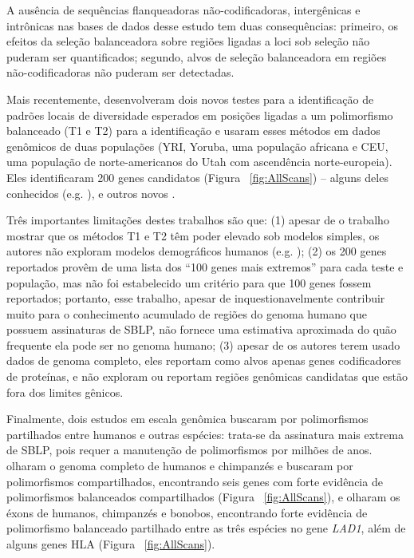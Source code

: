 \begin{refsection}
A ausência de sequências flanqueadoras não-codificadoras, intergênicas e intrônicas nas bases de dados desse estudo tem duas consequências: primeiro, os efeitos da seleção balanceadora sobre regiões ligadas a loci sob seleção não puderam ser quantificados; segundo, alvos de seleção balanceadora em regiões não-codificadoras não puderam ser detectadas.

Mais recentemente, \textcite{DeGiorgio2014} desenvolveram dois novos testes para a identificação de padrões locais de diversidade esperados em posições ligadas a um polimorfismo balanceado (T1 e T2) para a identificação e usaram esses métodos em dados genômicos de duas populações (YRI, Yoruba, uma população africana e CEU, uma população de norte-americanos do Utah com ascendência norte-europeia). Eles identificaram 200 genes candidatos (Figura ~\ref{fig:AllScans}) -- alguns deles conhecidos (e.g. \cite{Andres2009}), e outros novos \parencite{Key2014b}. 



Três importantes limitações destes trabalhos são que: (1) apesar de o trabalho mostrar que os métodos T1 e T2 têm poder elevado sob modelos simples, os autores não exploram modelos demográficos humanos (e.g. \cite{Gravel2011}); (2) os 200 genes reportados provêm de uma lista dos \enquote{100 genes mais extremos} para cada teste e população, mas não foi estabelecido um critério para que 100 genes fossem reportados; portanto, esse trabalho, apesar de inquestionavelmente contribuir muito para o conhecimento acumulado de regiões do genoma humano que possuem assinaturas de SBLP, não fornece uma estimativa aproximada do quão frequente ela pode ser no genoma humano; (3) apesar de os autores terem usado dados de genoma completo, eles reportam como alvos apenas genes codificadores de proteínas, e não exploram ou reportam regiões genômicas candidatas que estão fora dos limites gênicos.



Finalmente, dois estudos em escala genômica buscaram por polimorfismos partilhados entre humanos e outras espécies: trata-se da assinatura mais extrema de SBLP,  pois requer a manutenção de polimorfismos por milhões de anos. \textcite{Leffler2013a} olharam o genoma completo de humanos e chimpanzés e buscaram por polimorfismos compartilhados, encontrando seis genes com forte evidência de polimorfismos balanceados compartilhados (Figura ~\ref{fig:AllScans}), e \textcite{Teixeira2015} olharam os éxons de humanos, chimpanzés e bonobos, encontrando forte evidência de polimorfismo balanceado partilhado entre as três espécies no gene \emph{LAD1}, além de alguns genes HLA (Figura ~\ref{fig:AllScans}).


\end{refsection}
